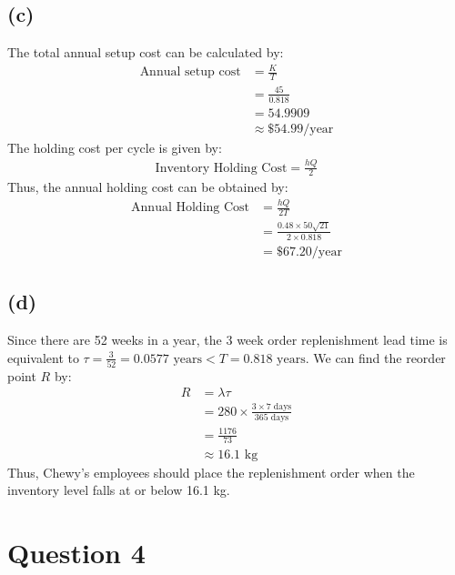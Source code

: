 \documentclass[12pt]{article}
\begin{document}
\subsection*{(c)}   

The total annual setup cost can be calculated by: \begin{align*}
    \text{Annual setup cost} &= \frac{K}{T} \\ 
    &= \frac{45}{0.818} \\ 
    &= 54.9909 \\ 
    &\approx \boxed{\$ 54.99 / \text{year}}
\end{align*} The holding cost per cycle is given by: \begin{align*}
    \text{Inventory Holding Cost} = \frac{hQ}{2}
\end{align*} Thus, the annual holding cost can be obtained by: \begin{align*}
    \text{Annual Holding Cost} &= \frac{hQ}{2T} \\ 
    &= \frac{0.48 \times 50\sqrt{21}}{2 \times 0.818} \\ 
    &= \boxed{\$ 67.20 / \text{year}}
\end{align*}

\subsection*{(d)}   

Since there are 52 weeks in a year, the 3 week order replenishment lead time is equivalent to $\tau = \frac{3}{52} = 0.0577 \text{ years}< T = 0.818 \text{ years}$. We can find the reorder point $R$ by: \begin{align*}
    R &= \lambda \tau \\ 
    &= 280 \times \frac{3\times 7 \text{ days}}{365 \text{ days}} \\ 
    &= \frac{1176}{73} \\ 
    &\approx \boxed{16.1 \text{ kg}}
\end{align*} Thus, Chewy's employees should place the replenishment order when the inventory level falls at or below 16.1 kg. 

\newpage

\section*{Question 4}

\end{document}

